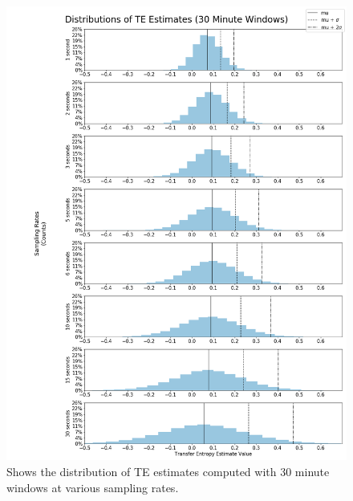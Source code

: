 \begin{figure}[!htb]
  \centerline{\includegraphics[scale=0.42]{figures/PredIF/30MinDist.png}}
  \caption{Shows the distribution of TE estimates computed with 30 minute windows at various sampling rates.}
  \label{fig:30MinDist}
\end{figure}

